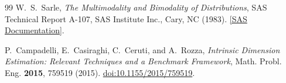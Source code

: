 \documentclass[11pt,a4paper]{article}
\begin{document}
\begin{thebibliography}{99}
W.~S.~Sarle,
\emph{The Multimodality and Bimodality of Distributions},
SAS Technical Report A-107, SAS Institute Inc., Cary, NC (1983).
\href{https://support.sas.com/documentation/onlinedoc/stat/141/multivar.pdf}{[SAS Documentation]}.

P.~Campadelli, E.~Casiraghi, C.~Ceruti, and A.~Rozza,
\emph{Intrinsic Dimension Estimation: Relevant Techniques and a Benchmark Framework},
Math. Probl. Eng. \textbf{2015}, 759519 (2015).
\href{https://doi.org/10.1155/2015/759519}{doi:10.1155/2015/759519}.
\end{thebibliography}
\end{document}
